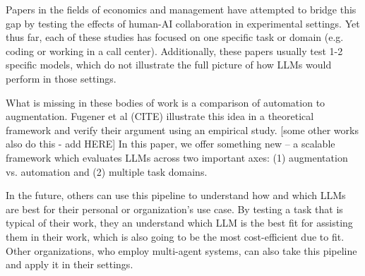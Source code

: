 Papers in the fields of economics and management have attempted to bridge this gap by testing the effects of human-AI collaboration in experimental settings. Yet thus far, each of these studies has focused on one specific task or domain (e.g. coding or working in a call center). Additionally, these papers usually test 1-2 specific models, which do not illustrate the full picture of how LLMs would perform in those settings.

What is missing in these bodies of work is a comparison of automation to augmentation. Fugener et al (CITE) illustrate this idea in a theoretical framework and verify their argument using an empirical study. [some other works also do this - add HERE] In this paper, we offer something new -- a scalable framework which evaluates LLMs across two important axes: (1) augmentation vs. automation and (2) multiple task domains. 

In the future, others can use this pipeline to understand how and which LLMs are best for their personal or organization's use case. By testing a task that is typical of their work, they an understand which LLM is the best fit for assisting them in their work, which is also going to be the most cost-efficient due to fit. Other organizations, who employ multi-agent systems, can also take this pipeline and apply it in their settings.
